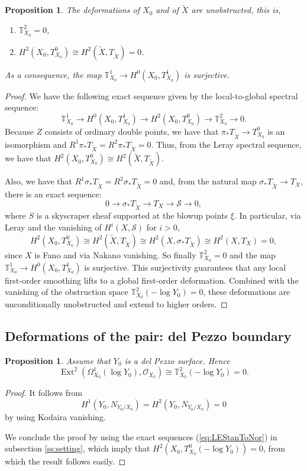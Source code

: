\documentclass[10pt,a4paper]{amsart}
\newtheorem{prop}[thm]{Proposition}
\newcommand{\OO}{\mathcal{O}}
\DeclareMathOperator{\Ext}{Ext}
\newcommand{\push}{\pi_*}             %
\begin{document}
\begin{prop}\label{prop:defAbs} The deformations of $X_0$ and of $\tilde X$ are unobstructed, this is, 
  \begin{enumerate}
  \item $\mathbb{T}_{X_0}^2=0$,
  \item $H^2(X_0,T_{X_0}^0)\cong H^2(\tilde X, T_{\tilde X})=0$.
  \end{enumerate} 
  As a consequence, the map $\mathbb{T}_{X_0}^1\to H^0(X_0, T_{X_0}^1)$ is surjective.
\end{prop}
\begin{proof}
  We have the following exact sequence given by the local-to-global spectral sequence:
  $$\mathbb{T}_{X_0}^1\to H^0(X_0,T_{X_0}^1)\to H^2(X_0, T_{X_0}^0)\to \mathbb{T}_{X_0}^2\to 0. $$
  Because $Z$ consists of ordinary double points, we have that $\push T_{\tilde X}\to T_{X_0}^0$ is an isomorphism and $R^1\push T_{\tilde X}=R^2\push T_{\tilde X}=0.$
  Thus, from the Leray spectral sequence, we have that $H^2(X_0,T_{X_0}^0)\cong H^2(\tilde X, T_{\tilde X})$. 

  Also, we have that $R^1\sigma_* T_{\tilde X}=R^2\sigma_* T_{\tilde X}=0$ and, from the natural map $\sigma_* T_{\tilde X}\to T_X$, there is an exact sequence:
  $$0\to \sigma_* T_{\tilde X}\to T_X\to \mathcal{S}\to 0, $$
  where $S$ is a skyscraper sheaf supported at the blowup points $\xi$. In particular, via Leray and the vanishing of $H^i(X,\mathcal{S})$ for $i>0$, 
  $$H^2(X_0, T_{X_0}^0)\cong H^2(\tilde X, T_{\tilde X})\cong H^2(X, \sigma_* T_{\tilde X})\cong H^2(X, T_X)=0, $$
  since $X$ is Fano and via Nakano vanishing. So finally $\mathbb{T}_{X_0}^2=0$ and the map $\mathbb{T}_{X_0}^1\to H^0(X_0, T_{X_0}^1)$ is surjective. This surjectivity guarantees that any local first-order smoothing lifts to a global first-order deformation. Combined with the vanishing of the obstruction space $\mathbb{T}_{X_0}^2(-\log Y_0) = 0$, these deformations are unconditionally unobstructed and extend to higher orders.
\end{proof}

\subsection{Deformations of the pair: del Pezzo boundary}
\begin{prop}
  Assume that $Y_0$ is a del Pezzo surface. Hence
  $$\Ext^2(\Omega_{X_0}^1(\log Y_0),\OO_{X_0})\cong \mathbb{T}_{X_0}^2(-\log Y_0)=0. $$
\end{prop}
\begin{proof}
  It follows from 
  $$H^1(Y_0, N_{Y_0/X_0})=H^2(Y_0, N_{Y_0/X_0})=0 $$
  by using Kodaira vanishing.

  We conclude the proof by using the exact sequences (\ref{eq:LEStanToNor}) in subsection \ref{ss:setting}, which imply that $H^2(X_0, T_{X_0}^0(-\log Y_0))=0$, from which the result follows easily.
\end{proof}
\end{document}
